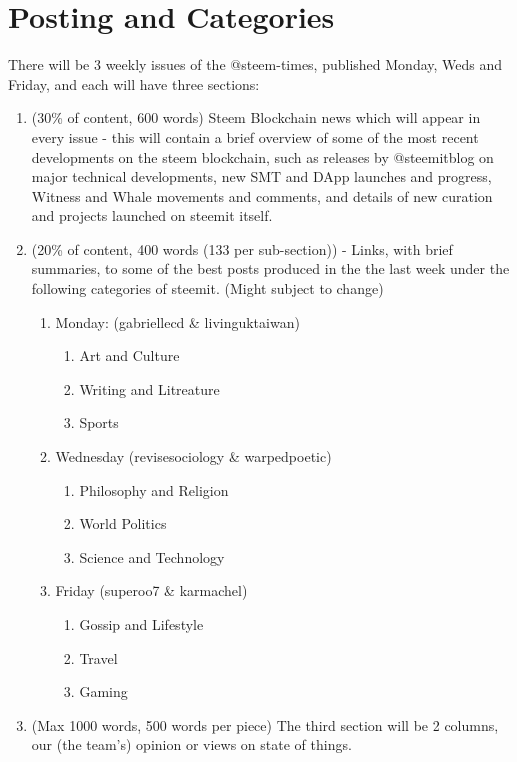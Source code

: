\documentclass[a4paper,12pt]{article}
\newcommand{\sectionbreak}{\clearpage}
\begin{document}
\sectionbreak
\section {Posting and Categories}

There will be 3 weekly issues of the @steem-times, published Monday, Weds and Friday, and each will have three sections:
\begin{enumerate}
    \item (30\% of content, 600 words) Steem Blockchain news which will appear in every issue - this will contain a brief overview of some of the most recent developments on the steem blockchain, such as releases by @steemitblog on major technical developments, new SMT and DApp launches and progress, Witness and Whale movements and comments, and details of new curation and projects launched on steemit itself. 
    \item (20\% of content, 400 words (133 per sub-section)) - Links, with brief summaries, to some of the best posts produced in the the last week under the following categories of steemit. (Might subject to change)
    \begin{enumerate}
        \item Monday: (gabriellecd \& livinguktaiwan)
            \begin{enumerate}
                \item Art and Culture
                \item Writing and Litreature
                \item Sports
            \end{enumerate}
        \item Wednesday (revisesociology \& warpedpoetic)
            \begin{enumerate}
                \item Philosophy and Religion
                \item World Politics
                \item Science and Technology
            \end{enumerate}
        \item Friday (superoo7 \& karmachel)
            \begin{enumerate}
                \item Gossip and Lifestyle
                \item Travel
                \item Gaming
            \end{enumerate}
    \end{enumerate}
    \item (Max 1000 words, 500 words per piece) The third section will be 2 columns, our (the team’s) opinion or views on state of things.

\end{enumerate}
\end{document}
